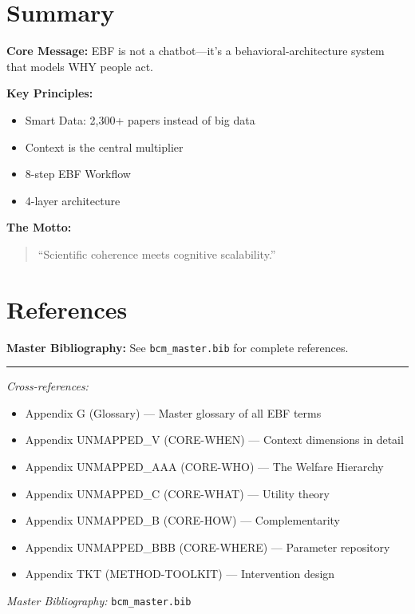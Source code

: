 \section{Summary}
\label{sec:ref-ebf-summary}

\begin{tcolorbox}[colback=green!10!white, colframe=green!75!black,
    title=\textbf{Appendix UNMAPPED_BL: Summary}]

\textbf{Core Message:} EBF is not a chatbot---it's a behavioral-architecture
system that models WHY people act.

\textbf{Key Principles:}
\begin{itemize}[nosep]
\item Smart Data: 2,300+ papers instead of big data
\item Context is the central multiplier
\item 8-step EBF Workflow
\item 4-layer architecture
\end{itemize}

\textbf{The Motto:}
\begin{quote}
``Scientific coherence meets cognitive scalability.''
\end{quote}

\end{tcolorbox}


\section{References}
\label{sec:ref-ebf-references}

\nocite{bcm_master}

\begin{tcolorbox}[colback=blue!5!white, colframe=blue!75!black]
\textbf{Master Bibliography:} See \texttt{bcm\_master.bib} for complete references.
\end{tcolorbox}

\vspace{1em}
\hrule
\vspace{0.5em}

\noindent\textit{Cross-references:}
\begin{itemize}[nosep]
\item Appendix G (Glossary) --- Master glossary of all EBF terms
\item Appendix UNMAPPED_V (CORE-WHEN) --- Context dimensions in detail
\item Appendix UNMAPPED_AAA (CORE-WHO) --- The Welfare Hierarchy
\item Appendix UNMAPPED_C (CORE-WHAT) --- Utility theory
\item Appendix UNMAPPED_B (CORE-HOW) --- Complementarity
\item Appendix UNMAPPED_BBB (CORE-WHERE) --- Parameter repository
\item Appendix TKT (METHOD-TOOLKIT) --- Intervention design
\end{itemize}

\noindent\textit{Master Bibliography:} \texttt{bcm\_master.bib}

